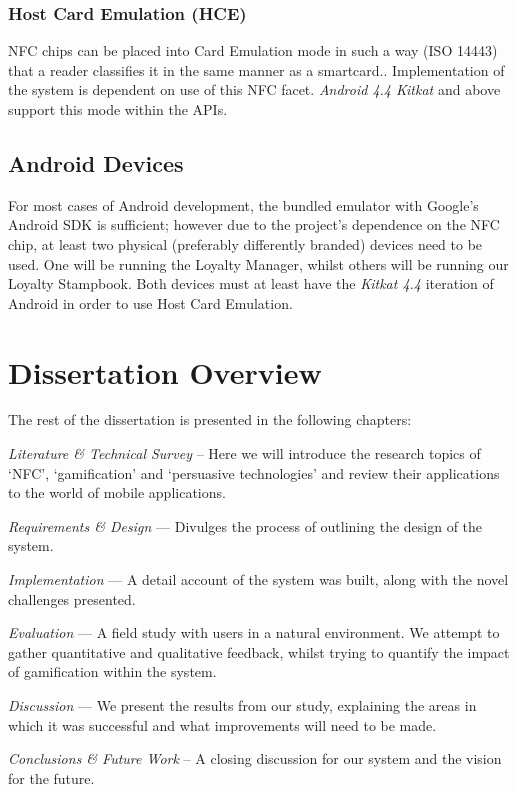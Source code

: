 \subsubsection{Host Card Emulation (HCE)}
\label{sec:initalHCE}
NFC chips can be placed into Card Emulation mode in such a way (ISO 14443) that a reader classifies it in the same manner as a smartcard.\cite{ecosystem}. Implementation of the system is dependent on use of this NFC facet. \emph{Android 4.4 Kitkat} and above support this mode within the APIs.
\subsection{Android Devices}
For most cases of Android development, the bundled emulator with Google's Android SDK is sufficient; however due to the project's dependence on the NFC chip, at least two physical (preferably differently branded) devices need to be used. One will be running the Loyalty Manager, whilst others will be running our Loyalty Stampbook. Both devices must at least have the \emph{Kitkat 4.4} iteration of Android in order to use Host Card Emulation.

\section{Dissertation Overview}
The rest of the dissertation is presented in the following chapters:
\begin{description}[leftmargin=!,labelwidth=\widthof{\bfseries Medium}]
    \item[Chapter 2] \emph{Literature \& Technical Survey} -- Here we will introduce the research topics of `NFC', `gamification' and `persuasive technologies' and review their applications to the world of mobile applications. 
    \item[Chapter 3] \emph{Requirements \& Design} --- Divulges the process of outlining the design of the system.
    \item[Chapter 4] \emph{Implementation} --- A detail account of the system was built, along with the novel challenges presented. 
    \item[Chapter 5] \emph{Evaluation} --- A field study with users in a natural environment. We attempt to gather quantitative and qualitative feedback, whilst trying to quantify the impact of gamification within the system. 
    \item[Chapter 6] \emph{Discussion} --- We present the results from our study, explaining the areas in which it was successful and what improvements will need to be made. 
    \item[Chapter 7] \emph{Conclusions \& Future Work} -- A closing discussion for our system and the vision for the future. 
\end{description}